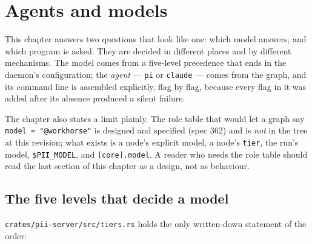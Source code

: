 \chapter{Agents and models}

\label{ch:agents}

This chapter answers two questions that look like one: which model answers, and which program
is asked. They are decided in different places and by different mechanisms. The model comes
from a five-level precedence that ends in the daemon's configuration; the \emph{agent} ---
\texttt{pi} or \texttt{claude} --- comes from the graph, and its command line is assembled
explicitly, flag by flag, because every flag in it was added after its absence produced a
silent failure.

The chapter also states a limit plainly. The role table that would let a graph say
\texttt{model = "@workhorse"} is designed and specified (spec 362) and is \emph{not} in the
tree at this revision; what exists is a node's explicit model, a node's \texttt{tier}, the
run's model, \texttt{\$PII\_MODEL}, and \texttt{[core].model}. A reader who needs the role
table should read the last section of this chapter as a design, not as behaviour.

\section{The five levels that decide a model}

\texttt{crates/pii-server/src/tiers.rs} holds the only written-down statement of the order:

\begin{center}
\end{center}

